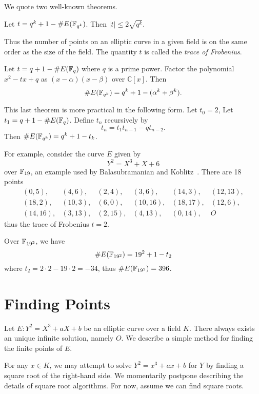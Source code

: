 We quote two well-known theorems.

\begin{theorem}
[Hasse] Let $t = q^k + 1 - \#E(\mathbb{F}_{q^k})$.
Then $|t| \le 2\sqrt{q^k}$.
\end{theorem}

Thus the number of points on an elliptic curve in a given field
is on the same order as the size of the field.
The quantity $t$ is called the \emph{trace of Frobenius}.

\begin{theorem}
[Weil] Let $t = q + 1 - \#E(\mathbb{F}_q)$
where $q$ is a prime power.
Factor the polynomial $x^2 - t x + q$ as $(x-\alpha)(x-\beta)$ over
$\mathbb{C}[x]$.
Then
\[ \#E(\mathbb{F}_{q^k}) = q^k + 1 - (\alpha^k + \beta^k) .\]
\end{theorem}

This last theorem is more practical in the following form. Let $t_0 = 2$,
Let $t_1 = q + 1 - \#E(\mathbb{F}_q)$.
Define $t_n$ recursively by
\[ t_n = t_1 t_{n-1} - q t_{n-2} .\]
Then $\#E(\mathbb{F}_{q^k}) = q^k + 1 - t_k$.

For example, consider the curve $E$ given by
\[ Y^2 = X^3 + X + 6 \]
over $\mathbb{F}_{19}$, an example used by Balasubramanian and Koblitz~\cite{bk}.
There are 18 points
\[
\begin{array}{llllll}
(0,5), & (4,6), & (2,4), & (3,6), & (14,3), & (12,13), \\
(18,2), & (10,3), & (6,0), & (10,16), & (18, 17), & (12,6), \\
(14,16), & (3,13), & (2,15), & (4,13), & (0,14), & O
\end{array}
\]
thus the trace of Frobenius $t = 2$.

Over $\mathbb{F}_{{19}^2}$, we have
\[
\#E(\mathbb{F}_{{19}^2}) = 19^2 + 1 - t_2
\]
where $t_2 = 2\cdot 2 - 19 \cdot 2 = -34$, thus
$\#E(\mathbb{F}_{{19}^2}) = 396$.

\section {Finding Points}

Let $E : Y^2 = X^3 + a X + b$
be an elliptic curve over a field $K$.
There always exists an unique infinite solution, namely $O$.
We describe a simple method for finding the finite points of $E$.

For any $x \in K$, we may attempt to
solve $Y^2 = x^3 + a x + b$ for $Y$ by finding a square root
of the right-hand side. We momentarily postpone describing the
details of square root algorithms.
For now, assume we can find square roots.

